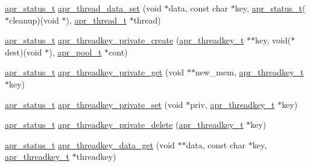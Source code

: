 \begin{DoxyCompactItemize}
\item 
\hyperlink{group__apr__errno_gaf76ee4543247e9fb3f3546203e590a6c}{apr\-\_\-status\-\_\-t} \hyperlink{group__apr__thread__proc_gaa90d79c9935692db4f27a6573f437221}{apr\-\_\-thread\-\_\-data\-\_\-set} (void $\ast$data, const char $\ast$key, \hyperlink{group__apr__errno_gaf76ee4543247e9fb3f3546203e590a6c}{apr\-\_\-status\-\_\-t}($\ast$cleanup)(void $\ast$), \hyperlink{group__apr__thread__proc_ga646c71351e723d84f8cc8c8d1d5937be}{apr\-\_\-thread\-\_\-t} $\ast$thread)
\item 
\hyperlink{group__apr__errno_gaf76ee4543247e9fb3f3546203e590a6c}{apr\-\_\-status\-\_\-t} \hyperlink{group__apr__thread__proc_gacb9553b2b3165388bfc0a54b1148804a}{apr\-\_\-threadkey\-\_\-private\-\_\-create} (\hyperlink{group__apr__thread__proc_ga337c9c1bd2d47740022071a5c41f2edb}{apr\-\_\-threadkey\-\_\-t} $\ast$$\ast$key, void($\ast$dest)(void $\ast$), \hyperlink{group__apr__pools_gaf137f28edcf9a086cd6bc36c20d7cdfb}{apr\-\_\-pool\-\_\-t} $\ast$cont)
\item 
\hyperlink{group__apr__errno_gaf76ee4543247e9fb3f3546203e590a6c}{apr\-\_\-status\-\_\-t} \hyperlink{group__apr__thread__proc_ga371c87c122cc3df0b7ad0031f6e11167}{apr\-\_\-threadkey\-\_\-private\-\_\-get} (void $\ast$$\ast$new\-\_\-mem, \hyperlink{group__apr__thread__proc_ga337c9c1bd2d47740022071a5c41f2edb}{apr\-\_\-threadkey\-\_\-t} $\ast$key)
\item 
\hyperlink{group__apr__errno_gaf76ee4543247e9fb3f3546203e590a6c}{apr\-\_\-status\-\_\-t} \hyperlink{group__apr__thread__proc_ga63501a064ca7f1818aa056b40146aa0b}{apr\-\_\-threadkey\-\_\-private\-\_\-set} (void $\ast$priv, \hyperlink{group__apr__thread__proc_ga337c9c1bd2d47740022071a5c41f2edb}{apr\-\_\-threadkey\-\_\-t} $\ast$key)
\item 
\hyperlink{group__apr__errno_gaf76ee4543247e9fb3f3546203e590a6c}{apr\-\_\-status\-\_\-t} \hyperlink{group__apr__thread__proc_ga20b9b79892a6532784fff023a4ebd8cf}{apr\-\_\-threadkey\-\_\-private\-\_\-delete} (\hyperlink{group__apr__thread__proc_ga337c9c1bd2d47740022071a5c41f2edb}{apr\-\_\-threadkey\-\_\-t} $\ast$key)
\item 
\hyperlink{group__apr__errno_gaf76ee4543247e9fb3f3546203e590a6c}{apr\-\_\-status\-\_\-t} \hyperlink{group__apr__thread__proc_gae203664972dfc5c555620ae1788f5b48}{apr\-\_\-threadkey\-\_\-data\-\_\-get} (void $\ast$$\ast$data, const char $\ast$key, \hyperlink{group__apr__thread__proc_ga337c9c1bd2d47740022071a5c41f2edb}{apr\-\_\-threadkey\-\_\-t} $\ast$threadkey)
\item 
$$
\end{DoxyCompactItemize}
